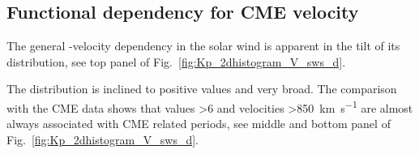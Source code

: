 \subsection{Functional dependency for CME velocity}
The general \Kp-velocity dependency in the solar wind is apparent in the tilt of its distribution, see top panel of Fig.~\ref{fig:Kp_2dhistogram_V_sws_d}.
\begin{figure}
\end{figure}
The distribution is inclined to positive values and very broad. The comparison with the CME data shows that \Kp{} values \num{>6} and velocities \SI{>850}{\km\per\s} are almost always associated with CME related periods, see middle and bottom panel of Fig.~\ref{fig:Kp_2dhistogram_V_sws_d}.

